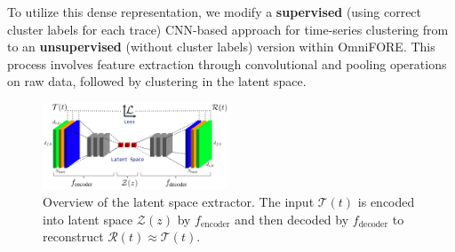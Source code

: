 \documentclass{ieeetmlcn}
\begin{document}
To utilize this dense representation, we modify a \textbf{supervised} (using correct cluster labels for each trace) CNN-based approach for time-series clustering from \cite{clusteringDL} to an \textbf{unsupervised} (without cluster labels) version within OmniFORE. This process involves feature extraction through convolutional and pooling operations on raw data, followed by clustering in the latent space.


\begin{figure}
\centering
\includegraphics[width=0.49\textwidth]{img/latent_space_creation.png}
\caption{Overview of the latent space extractor. The input $\mathcal{T}(t)$ is encoded into latent space $\mathcal{Z}(z)$ by $f_{\text{encoder}}$ and then decoded by $f_{\text{decoder}}$ to reconstruct $\mathcal{R}(t) \approx \mathcal{T}(t)$.}
\label{fig:latent_space_creation}
\end{figure}
\end{document}
